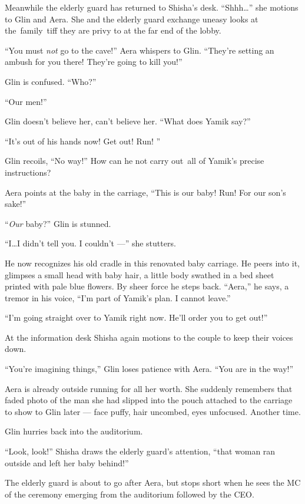 \documentclass[twoside,11pt]{book}
\begin{document}
Meanwhile the elderly guard has returned to Shisha's desk. ``Shhh{\ldots}'' she motions to Glin
and Aera. She and the elderly guard exchange{ u}neasy looks at the~family~tiff
they are privy to at the far end of the lobby.\textbf{ }

``You must \textit{not} go to the cave!'' Aera whispers to Glin.
``They're setting an ambush for you there! They're going to kill you!''

Glin is confused. ``Who?''

``Our men!''

Glin doesn't believe her, can't believe her.  ``What does Yamik say?''

``It's out of his hands now! Get out! Run! ''

Glin recoils, ``No way!'' How can he not carry out~all of Yamik's precise instructions?

Aera points at the baby in the carriage, ``This is our baby! Run! For our son's sake!''

``\textit{Our }baby?'' Glin is stunned.

``I{\ldots}I didn't tell you. I couldn't ---'' she stutters.

He now recognizes his old cradle in this renovated baby carriage.
He peers into it, glimpses a small head with baby hair, a little body
swathed in a bed sheet printed with pale blue flowers. By sheer force he steps back.
``Aera,'' he says, a tremor in his voice, ``I'm part of Yamik's plan. I cannot
leave.''

``I'm going straight over to Yamik right now. He'll order you to get out!''

At the information desk Shisha again motions to the couple to keep their voices down.

``You're imagining things,'' Glin loses patience with Aera. ``You are in the
way!''

Aera is already outside running for all her worth. She suddenly remembers that faded photo of the man she had slipped
into the pouch attached to the carriage to show to Glin later --- face puffy, hair uncombed, eyes unfocused. Another
time.

Glin hurries back into the auditorium.

``Look, look!'' Shisha draws the elderly guard's attention, ``that woman ran
outside and left her baby behind!''

The elderly guard is about to go after Aera, but stops short when he sees the MC of the ceremony emerging from the
auditorium followed by the CEO.
\end{document}
